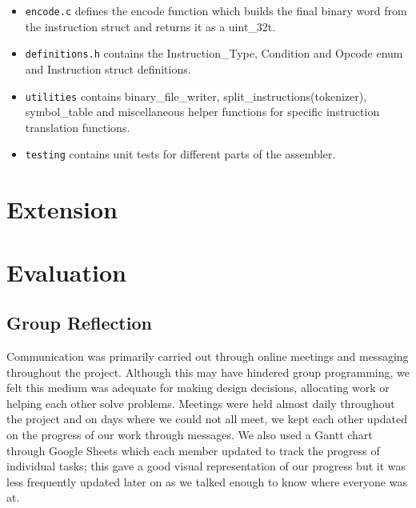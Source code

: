 \documentclass[11pt]{article}
\begin{document}
\begin{itemize}
\item \texttt{encode.c} defines the encode function which builds the final binary word from the instruction struct and returns it as a uint\_32t.

\item \texttt{definitions.h} contains the Instruction\_Type, Condition and Opcode enum and Instruction struct definitions.

\item \texttt{utilities} contains binary\_file\_writer, split\_instructions(tokenizer), symbol\_table and miscellaneous helper functions for specific instruction translation functions.

\item \texttt{testing} contains unit tests for different parts of the assembler.

\end{itemize}


  \section*{Extension}

  \subsection*{}
  \subsection*{}
  \subsection*{}

  \section*{Evaluation}

  \subsection*{Group Reflection}

Communication was primarily carried out through online meetings and messaging throughout the project. Although this may have hindered group programming, we felt this medium was adequate for making design decisions, allocating work or helping each other solve problems. Meetings were held almost daily throughout the project and on days where we could not all meet, we kept each other updated on the progress of our work through messages. We also used a Gantt chart through Google Sheets which each member updated to track the progress of individual tasks; this gave a good visual representation of our progress but it was less frequently updated later on as we talked enough to know where everyone was at.
\end{document}
